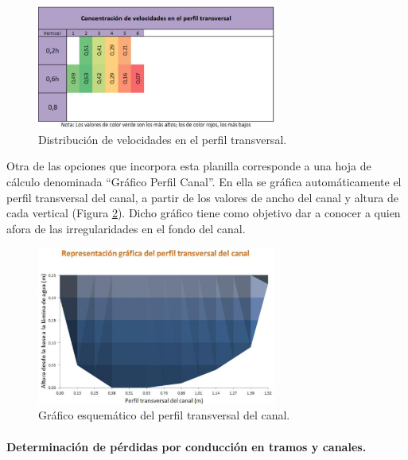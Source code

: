 \documentclass[]{article}
\begin{document}
\begin{figure}[H]
\centering
\includegraphics[width=0.7\textwidth]{images/perfil_tran.eps}
\caption{Distribución de velocidades en el perfil transversal.}
\label{dist_veloc}
\end{figure}

Otra de las opciones que incorpora esta planilla corresponde  a una hoja de cálculo denominada “Gráfico Perfil Canal”. En ella se gráfica automáticamente el perfil transversal del canal, a partir de los valores de ancho del canal y altura de cada vertical (Figura \ref{graf_esq}). Dicho gráfico tiene como objetivo dar a conocer a quien afora de las irregularidades en el fondo del canal.

\begin{figure}[H]
\centering
\includegraphics[width=0.7\textwidth]{images/grafico_esquematico.eps}
\caption{Gráfico esquemático del perfil transversal del canal.}
\label{graf_esq}
\end{figure}

\paragraph{Determinación de pérdidas por conducción en tramos y canales.}
\end{document}
